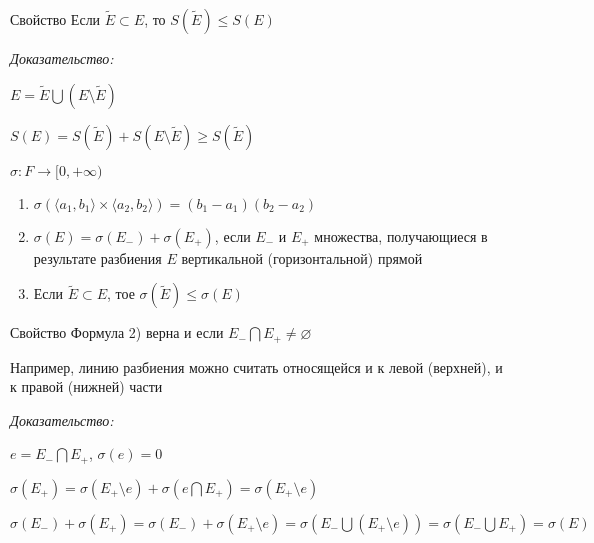 \documentclass[12pt]{article}
\newcommand{\q}[1]{\langle #1 \rangle}
\begin{document}
\begin{theo}{Свойство}
    Если $\tilde{E} \subset E$, то $S(\tilde{E}) \leq S(E)$
\end{theo}

\textit{Доказательство:}

$E = \tilde{E} \bigcup (E \setminus \tilde{E})$

$S(E) = S(\tilde{E}) + S(E \setminus \tilde{E}) \geq S(\tilde{E})$

\begin{defin}{}
    $\sigma : F \rightarrow [0, +\infty)$

    \begin{enumerate}
        \item $\sigma(\q{a_1, b_1} \times \q{a_2, b_2}) = (b_1 - a_1)(b_2 - a_2)$
        \item $\sigma(E) = \sigma(E_-) + \sigma(E_+)$, если $E_-$ и $E_+$ множества, получающиеся в результате разбиения $E$ вертикальной (горизонтальной) прямой
        \item Если $\tilde{E} \subset E$, тое $\sigma(\tilde{E}) \leq \sigma(E)$
    \end{enumerate}
\end{defin}

\begin{Remark}{Свойство}
    Формула 2) верна и если $E_- \bigcap E_+ \neq \varnothing$

    Например, линию разбиения можно считать относящейся и к левой (верхней), и к правой (нижней) части
\end{Remark}

\textit{Доказательство:}

$e = E_- \bigcap E_+$, $\sigma(e) = 0$

$\sigma(E_+) = \sigma(E_+ \setminus e) + \sigma(e \bigcap E_+) = \sigma(E_+ \setminus e)$

$\sigma(E_-) + \sigma(E_+) = \sigma(E_-) + \sigma(E_+ \setminus e) = \sigma(E_- \bigcup (E_+ \setminus e)) = \sigma(E_- \bigcup E_+) = \sigma(E)$
\end{document}
